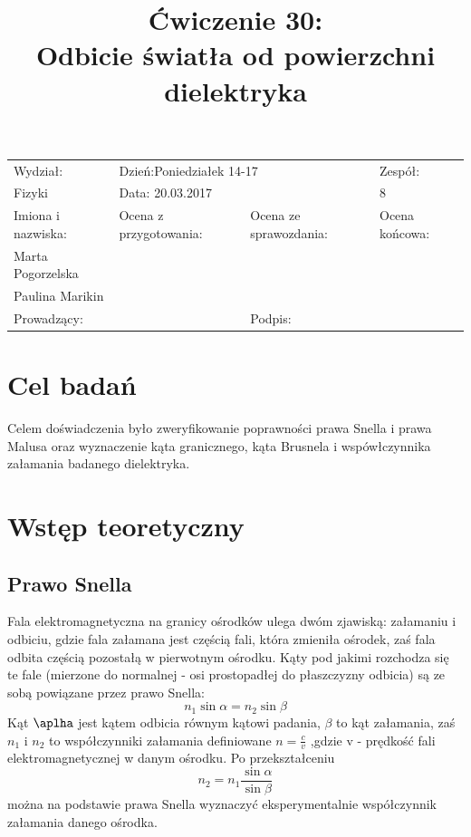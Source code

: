 \documentclass[a4paper,10pt]{article}
\def\arraystretch{1.2}
\begin{document}
\begin{table}
  \centering
  \def\arraystretch{1.5}
    \begin{tabular}{|l|l|l|l|} \hline
    Wydział:           & \multicolumn{2}{l|}{Dzień:Poniedziałek 14-17}    &Zespół:  \\
    Fizyki             &    \multicolumn{2}{l|}{Data: 20.03.2017}         &8             \\\hline
    Imiona i nazwiska: &Ocena z przygotowania:  &Ocena ze sprawozdania:   &Ocena końcowa: \\
    Marta Pogorzelska  &                        &                         &                \\
    Paulina Marikin    &                        &                         &\\\hline
    \multicolumn{2}{|l|}{Prowadzący:                 } &\multicolumn{2}{l|}{Podpis:             }  \\\hline
  \end{tabular}
\end{table}

\title{Ćwiczenie 30:\\Odbicie światła od powierzchni dielektryka}
\date{}
\maketitle

\section{Cel badań}
Celem doświadczenia było zweryfikowanie poprawności prawa Snella i prawa Malusa oraz wyznaczenie
kąta granicznego, kąta Brusnela i wspówłczynnika załamania badanego dielektryka.

\section{Wstęp teoretyczny}
\subsection{Prawo Snella}
Fala elektromagnetyczna na granicy ośrodków ulega dwóm zjawiską: załamaniu i odbiciu, gdzie fala załamana jest częścią fali, która zmieniła
ośrodek, zaś fala odbita częścią pozostałą w pierwotnym ośrodku. Kąty pod jakimi rozchodza się te fale (mierzone do normalnej - osi prostopadłej do płaszczyzny odbicia)
 są ze sobą powiązane przez prawo Snella:
\begin{equation}
    n_1\sin{\alpha} = n_2\sin{\beta}
\end{equation}
Kąt $\aplha$ jest kątem odbicia równym kątowi padania, $\beta$ to kąt załamania, zaś $n_1$ i $n_2$ to współczynniki załamania definiowane $n = \frac{c}{v}$
,gdzie v - prędkość fali elektromagnetycznej w danym ośrodku. Po przekształceniu
\begin{equation}
n_2 = n_1 \frac{\sin{\alpha}}{\sin{\beta}}
\end{equation}
można na podstawie prawa Snella wyznaczyć eksperymentalnie współczynnik załamania danego ośrodka.
\end{document}
